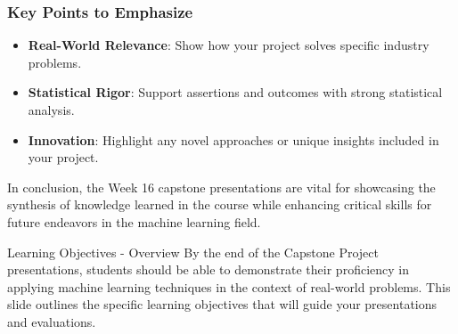 \documentclass[aspectratio=169]{beamer}
\begin{document}
\begin{frame}[fragile]
    \frametitle{Key Points to Emphasize}
    \begin{itemize}
        \item \textbf{Real-World Relevance}: Show how your project solves specific industry problems.
        \item \textbf{Statistical Rigor}: Support assertions and outcomes with strong statistical analysis.
        \item \textbf{Innovation}: Highlight any novel approaches or unique insights included in your project.
    \end{itemize}
    In conclusion, the Week 16 capstone presentations are vital for showcasing the synthesis of knowledge learned in the course while enhancing critical skills for future endeavors in the machine learning field.
\end{frame}

\begin{frame}[fragile]{Learning Objectives - Overview}
    By the end of the Capstone Project presentations, students should be able to demonstrate their proficiency in applying machine learning techniques in the context of real-world problems. This slide outlines the specific learning objectives that will guide your presentations and evaluations.
\end{frame}
\end{document}
